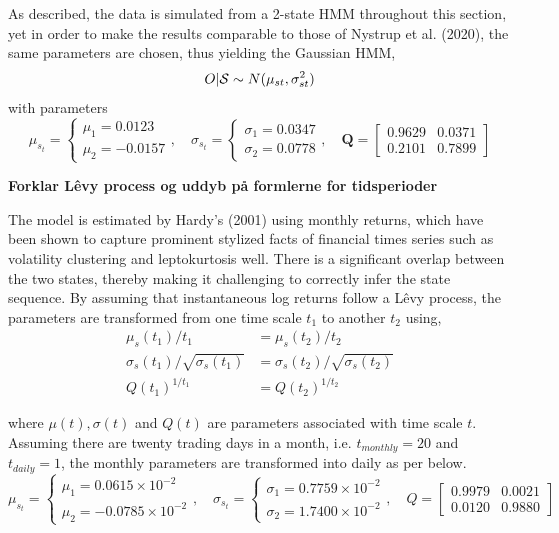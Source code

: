As described, the data is simulated from a 2-state HMM throughout this section, yet in order to make the results comparable to those of Nystrup et al. (2020), the same parameters are chosen, thus yielding the Gaussian HMM,
\begin{equation*}
    O|\S \sim N(\mu_{st}, \sigma_{st}^2)
\end{equation*}
with parameters
$$
    \mu_{s_t}=
    \begin{cases}
        \mu_1= 0.0123 \\
        \mu_2= -0.0157
    \end{cases}, \quad
    \sigma_{s_t} =
    \begin{cases}
        \sigma_1 = 0.0347 \\
        \sigma_2 = 0.0778
    \end{cases}, \quad
    \mathbf{Q} = 
    \begin{bmatrix}
        0.9629 & 0.0371 \\
        0.2101 & 0.7899
    \end{bmatrix}
$$

\textbf{Forklar Lêvy process og uddyb på formlerne for tidsperioder}

The model is estimated by Hardy's (2001) using monthly returns, which have been shown to capture prominent stylized facts of financial times series such as volatility clustering and leptokurtosis well. There is a significant overlap between the two states, thereby making it challenging to correctly infer the state sequence. By assuming that instantaneous log returns follow a Lêvy process, the parameters are transformed from one time scale $t_1$ to another $t_2$ using,
\begin{align*}
    \mu_s(t_1) / t_1 &= \mu_s(t_2) / t_2 \\
    \sigma_s(t_1) / \sqrt{\sigma_s(t_1)} &= \sigma_s(t_2) / \sqrt{\sigma_s(t_2)} \\
    Q(t_1)^{1/t_1} &= Q(t_2)^{1/t_2}
\end{align*}

where $\mu(t), \sigma(t)$ and $Q(t)$ are parameters associated with time scale $t$. Assuming there are twenty trading days in a month, i.e. $t_{monthly}=20$ and $t_{daily}=1$, the monthly parameters are transformed into daily as per below.
$$
    \mu_{s_t}=
    \begin{cases}
        \mu_1= 0.0615 \times 10^{-2} \\
        \mu_2= -0.0785 \times 10^{-2}
    \end{cases}, \quad
    \sigma_{s_t} =
    \begin{cases}
        \sigma_1 = 0.7759 \times 10^{-2} \\
        \sigma_2 = 1.7400 \times 10^{-2}
    \end{cases}, \quad
    Q = 
    \begin{bmatrix}
        0.9979 & 0.0021 \\
        0.0120 & 0.9880
    \end{bmatrix}
$$

